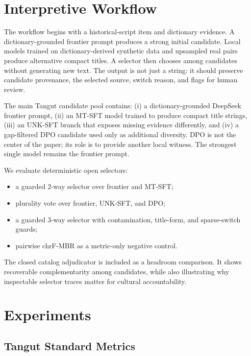 \documentclass{article}
\begin{document}
\section{Interpretive Workflow}

The workflow begins with a historical-script item and dictionary evidence. A dictionary-grounded frontier prompt produces a strong initial candidate. Local models trained on dictionary-derived synthetic data and upsampled real pairs produce alternative compact titles. A selector then chooses among candidates without generating new text. The output is not just a string: it should preserve candidate provenance, the selected source, switch reason, and flags for human review.

The main Tangut candidate pool contains: (i) a dictionary-grounded DeepSeek frontier prompt, (ii) an MT-SFT model trained to produce compact title strings, (iii) an UNK-SFT branch that exposes missing evidence differently, and (iv) a gap-filtered DPO candidate used only as additional diversity. DPO is not the center of the paper; its role is to provide another local witness. The strongest single model remains the frontier prompt.

We evaluate deterministic open selectors:
\begin{itemize}
    \item a guarded 2-way selector over frontier and MT-SFT;
    \item plurality vote over frontier, UNK-SFT, and DPO;
    \item a guarded 3-way selector with contamination, title-form, and sparse-switch guards;
    \item pairwise chrF-MBR as a metric-only negative control.
\end{itemize}
The closed catalog adjudicator is included as a headroom comparison. It shows recoverable complementarity among candidates, while also illustrating why inspectable selector traces matter for cultural accountability.

\section{Experiments}

\subsection{Tangut Standard Metrics}
\end{document}

